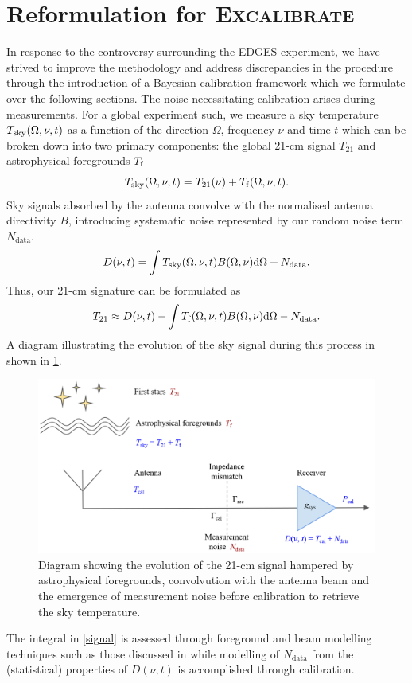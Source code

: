 \section{Reformulation for \textsc{Excalibrate}}\label{sec:reach_formalism}
 In response to the controversy surrounding the EDGES experiment, we have strived to improve the methodology and address discrepancies in the procedure through the introduction of a Bayesian calibration framework which we formulate over the following sections. The noise necessitating calibration arises during measurements. For a global experiment such, we measure a sky temperature $T_{\mathrm{sky}}(\Omega, \nu, t)$ as a function of the direction $\Omega$, frequency $\nu$ and time $t$ which can be broken down into two primary components: the global 21-cm signal $T_{21}$ and astrophysical foregrounds $T_{\mathrm{f}}$
\begin{equation}
    \label{tsky}
    T_{\mathrm{sky}}(\Omega, \nu, t) = T_{21}(\nu) + T_{\mathrm{f}}(\Omega, \nu, t).
\end{equation}
Sky signals absorbed by the antenna convolve with the normalised antenna directivity $B$, introducing systematic noise represented by our random noise term $N_{\mathrm{data}}$.
\begin{equation}\label{eqn:bayestsource}
    D(\nu, t) = \int T_{\mathrm{sky}}(\Omega, \nu, t) B(\Omega, \nu)\mathrm{d}\Omega + N_{\mathrm{data}}.
\end{equation}
Thus, our 21-cm signature can be formulated as
\begin{equation}\label{signal}
  T_{21} \approx D(\nu, t) - \int T_{\mathrm{f}}(\Omega, \nu, t)B(\Omega, \nu)\mathrm{d}\Omega - N_{\mathrm{data}}.
\end{equation}
A diagram illustrating the evolution of the sky signal during this process in shown in \cref{fig:nsfig}.
\begin{figure}
    \centering
    \includegraphics[width=.7\textwidth]{nsdiag}
    \caption{Diagram showing the evolution of the 21-cm signal hampered by astrophysical foregrounds, convolvution with the antenna beam and the emergence of measurement noise before calibration to retrieve the sky temperature.}
    \label{fig:nsfig}
\end{figure}
The integral in \cref{signal} is assessed through foreground and beam modelling techniques such as those discussed in \citet{dom} while modelling of $N_{\mathrm{data}}$ from the (statistical) properties of $D(\nu, t)$ is accomplished through calibration.

